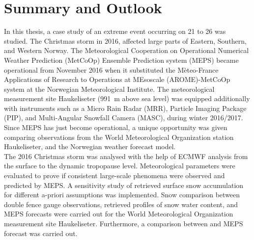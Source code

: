 
\chapter{Summary and Outlook}
In this thesis, a case study of an extreme event occurring on \num{21} to \SI{26}{\dec} was studied. The Christmas storm in 2016, affected large parts of Eastern, Southern, and Western Norway. The Meteorological Cooperation on Operational Numerical Weather Prediction (MetCoOp) Ensemble Prediction system (MEPS) became operational from November 2016 when it substituted the Mèteo-France Applications of Research to Operations at MEsoscale (AROME)-MetCoOp system at the Norwegian Meteorological Institute. 
The meteorological measurement site Haukeliseter (\SI{991}{\metre} above sea level) was equipped additionally with instruments such as a Micro Rain Radar (MRR), Particle Imaging Package (PIP), and Multi-Angular Snowfall Camera (MASC), during winter 2016/2017. 
Since MEPS has just become operational, a unique opportunity was given comparing observations from the World Meteorological Organization station Haukeliseter, and the Norwegian weather forecast model.
\\
The 2016 Christmas storm was analysed with the help of ECMWF analysis from the surface to the dynamic tropopause level. Meteorological parameters were evaluated to prove if consistent large-scale phenomena were observed and predicted by MEPS.
A sensitivity study of retrieved surface snow accumulation for different a-priori assumptions was implemented. 
Snow comparison between double fence gauge observations, retrieved profiles of snow water content, and MEPS forecasts were carried out for the World Meteorological Organization measurement site Haukeliseter. 
Furthermore, a comparison between  and MEPS forecast was carried out. %
\par\medskip
\noindent
